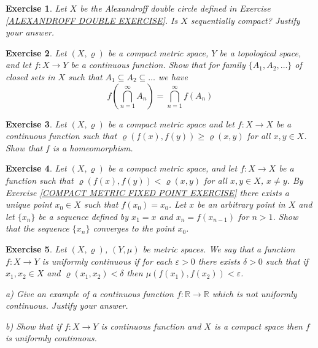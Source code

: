 \documentclass[11pt, letterpaper, oneside]{report}
\theoremstyle{pplain}
\newtheorem{ITERMVALUE THM}[theorem]{Intermediate Value Theorem}
\newtheorem{HEINEBOREL THM}[theorem]{Heine-Borel Theorem}
\newtheorem{UMETR THM}[theorem]{Urysohn Metrization Theorem}
\newtheorem{UMETR2 THM}[theorem]{Urysohn Metrization Theorem (v.2)}
\theoremstyle{ddefinition}
\theoremstyle{nnn}
\newtheorem{TDA NN}[theorem]{Topological Data Analysis. }
\theoremstyle{eexercise}
\newtheorem{exercise}{Exercise}[chapter]
\newcommand{\R}{{\mathbb R}}
\begin{document}
\begin{exercise}
Let $X$ be the Alexandroff double circle defined in Exercise \ref{ALEXANDROFF DOUBLE EXERCISE}. 
Is $X$ sequentially compact? Justify your answer. 
\end{exercise}




\begin{exercise}
Let $(X, \varrho)$ be a compact metric space, $Y$ be a topological space, and let 
$f\colon X \to Y$ be a continuous function. Show that for family $\{A_{1}, A_{2}, \dots \}$ of 
closed sets in $X$ such that $A_{1}\subseteq A_{2} \subseteq {\dots}$ we have 
$$f\left(\bigcap_{n=1}^{\infty} A_{n} \right) = \bigcap_{n=1}^{\infty} f(A_{n})$$
\end{exercise}







\begin{exercise}
Let $(X, \varrho)$ be a compact metric space and let $f\colon X\to X$ be a continuous 
function such that $\varrho(f(x), f(y)) \geq \varrho(x, y)$ for all $x, y\in X$. Show that $f$ is a homeomorphism.  
\end{exercise}





\begin{exercise}
Let $(X, \varrho)$ be a compact metric space, and let $f\colon X\to X$ be a function 
such that $\varrho(f(x), f(y)) < \varrho(x, y)$ for all $x, y\in X$, $x\neq y$.  
By Exercise \ref{COMPACT METRIC FIXED POINT EXERCISE} there exists a unique 
point $x_{0}\in X$ such that $f(x_{0}) = x_{0}$. Let $x$ be an arbitrary point in $X$ and
let $\{x_{n}\}$ be a sequence defined by  $x_{1} = x$ and $x_{n} = f(x_{n-1})$ for $n>1$. 
Show that the sequence $\{x_{n}\}$ converges to the point $x_{0}$.  
\end{exercise}




\begin{exercise}
Let $(X, \varrho)$, $(Y, \mu)$ be metric spaces. We say that a function $f\colon X\to Y$ is 
\emph{uniformly continuous} if for each $\varepsilon > 0$ there exists $\delta >0$ such that 
if $x_{1}, x_{2} \in X$ and $\varrho(x_{1}, x_{2}) < \delta$ then $\mu(f(x_{1}), f(x_{2})) < \varepsilon$. 

a) Give an example of a continuous function $f\colon \R\to \R$ which is not uniformly continuous. Justify 
your answer.  

b) Show that if $f\colon X \to Y$ is continuous function and $X$ is a compact space then
$f$ is uniformly continuous. 
\end{exercise}
\end{document}
